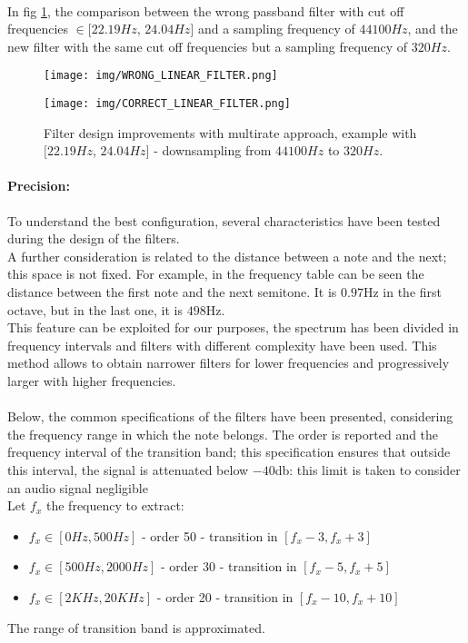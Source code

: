 \vspace{10mm}
\\In fig \ref{fig:multirate_result}, the comparison between the wrong passband filter with cut off frequencies $\in [22.19Hz$,  $24.04Hz]$ and a sampling frequency of $44100Hz$, and the new filter with the same cut off frequencies but a sampling frequency of $320Hz$.
\begin{figure}[h]
\begin{minipage}{\textwidth}
\centering
\texttt{[image: img/WRONG\_LINEAR\_FILTER.png]} 
\end{minipage}
\begin{minipage}{\textwidth}
\centering
\texttt{[image: img/CORRECT\_LINEAR\_FILTER.png]} 
\end{minipage}
\caption{Filter design improvements with multirate approach, example with $[22.19Hz$,  $24.04Hz]$ - downsampling from $44100Hz$ to $320 Hz$.} \label{fig:multirate_result}
\end{figure}

\paragraph{Precision:}
To understand the best configuration, several characteristics have been tested during the design of the filters.\\
A further consideration is related to the distance between a note and the next; this space is not fixed. For example, in the frequency table can be seen the distance between the first note and the next semitone. It is $0.97$Hz in the first octave, but in the last one, it is $498$Hz.\\
This feature can be exploited for our purposes, the spectrum has been divided in frequency intervals and filters with different complexity have been used. This method allows to obtain narrower filters for lower frequencies and progressively larger with higher frequencies.\\\\
Below, the common specifications of the filters have been presented, considering the frequency range in which the note belongs. The order is reported and the frequency interval of the transition band; this specification ensures that outside this interval, the signal is attenuated below $-40$db: this limit is taken to consider an audio signal negligible\\
Let $f_x$ the frequency to extract:
\begin{itemize}
	\item $f_x \in [0Hz, 500 Hz]$ - order 50 - transition in $[f_x - 3, f_x + 3] $
	\item $f_x \in [500Hz, 2000Hz]$ - order 30 - transition in $[f_x - 5 , f_x + 5 ] $
	\item $f_x \in [2 KHz, 20 KHz]$ - order 20 - transition in $[f_x - 10 , f_x + 10 ] $
\end{itemize}
The range of transition band is approximated.
